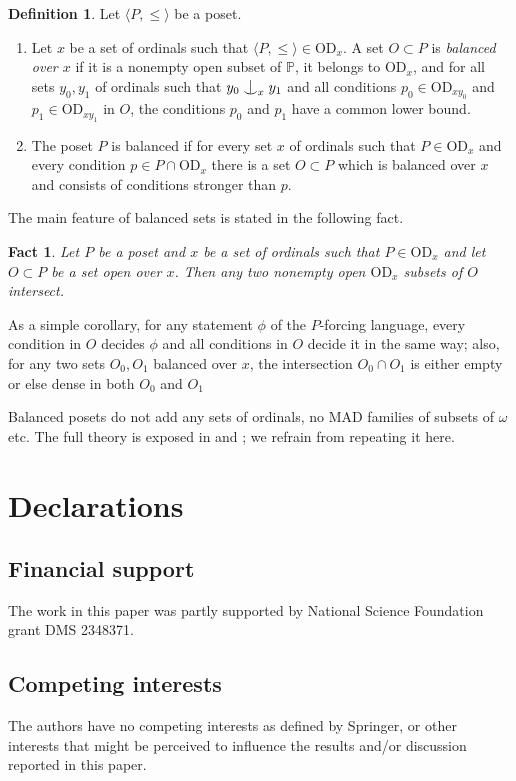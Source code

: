 \documentclass{article}
\newcommand{\gw}{\omega}
\newcommand{\forkindep}[1][]{%
  \mathrel{
    \mathop{
      \vcenter{
        \hbox{\oalign{\noalign{\kern-.3ex}\hfil$\vert$\hfil\cr
              \noalign{\kern-.7ex}
              $\smile$\cr\noalign{\kern-.3ex}}}
      }
    }\displaylimits_{#1}
  }
}
\newcommand{\vd}{\mathrm{OD}}
\newtheorem{fact}[theorem]{Fact}
\theoremstyle{definition}
\newtheorem{definition}[theorem]{Definition}
\begin{document}
	\begin{definition}
		Let $\langle P, \leq\rangle$ be a poset. 
		
		\begin{enumerate}
			\item Let $x$ be a set of ordinals such that $\langle P, \leq \rangle\in \vd_x$. A set $O\subset P$ is \emph{balanced over $x$} if it is a nonempty open subset of $\mathbb{P}$, it belongs to $\vd_x$, and for all sets $y_0, y_1$ of ordinals such that $y_0\forkindep[x] y_1$ and all conditions $p_0\in\vd_{xy_0}$ and $p_1\in\vd_{xy_1}$ in $O$, the conditions $p_0$ and $p_1$ have a common lower bound.
			\item The poset $P$ is balanced if for every set $x$ of ordinals such that $P\in\vd_x$ and every condition $p\in P\cap\vd_x$ there is a set $O\subset P$ which is balanced over $x$ and consists of conditions stronger than $p$.
		\end{enumerate}
	\end{definition}

\noindent The main feature of balanced sets is stated in the following fact.

\begin{fact}
\label{factbal}
Let $P$ be a poset and $x$ be a set of ordinals such that $P\in\vd_x$ and let $O\subset P$ be a set open over $x$. Then any two nonempty open $\vd_x$  subsets of $O$ intersect.
\end{fact}

\noindent As a simple corollary, for any statement $\phi$ of the $P$-forcing language, every condition in $O$ decides $\phi$ and all conditions in $O$ decide it in the same way; also, for any two sets $O_0, O_1$ balanced over $x$, the intersection $O_0\cap O_1$ is either empty or else dense in both $O_0$ and $O_1$
	
	Balanced posets do not add any sets of ordinals, no MAD families of subsets of $\gw$ etc. The full theory is exposed in \cite{z:geometric} and \cite{z:reloadedB}; we refrain from repeating it here.
	

\section{Declarations}

\subsection{Financial support}

The work in this paper was partly supported by National Science Foundation grant  DMS 2348371.

\subsection{Competing interests}

The authors have no competing interests as defined by Springer, or other interests that might be perceived to influence the results and/or discussion reported in this paper.



 

\end{document}
